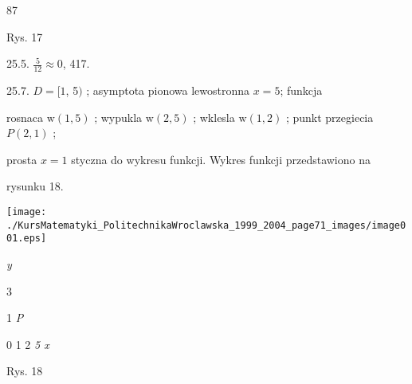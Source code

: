 \documentclass[a4paper,12pt]{article}
\begin{document}
87

Rys. 17

25.5. $\displaystyle \frac{5}{12}\approx 0$, 417.

25.7. $D = [1$, 5$)$ ; asymptota pionowa lewostronna $x = 5$; funkcja

rosnaca $\mathrm{w}(1,5)$ ; wypukla $\mathrm{w}(2,5)$ ; wklesla $\mathrm{w}(1,2)$ ; punkt przegiecia $P(2,1)$ ;

prosta $x=1$ styczna do wykresu funkcji. Wykres funkcji przedstawiono na

rysunku 18.
\begin{center}
\texttt{[image: ./KursMatematyki\_PolitechnikaWroclawska\_1999\_2004\_page71\_images/image001.eps]}
\end{center}
{\it y}

3

1  {\it P}

0 1  2  {\it 5 x}

Rys. 18
\end{document}
